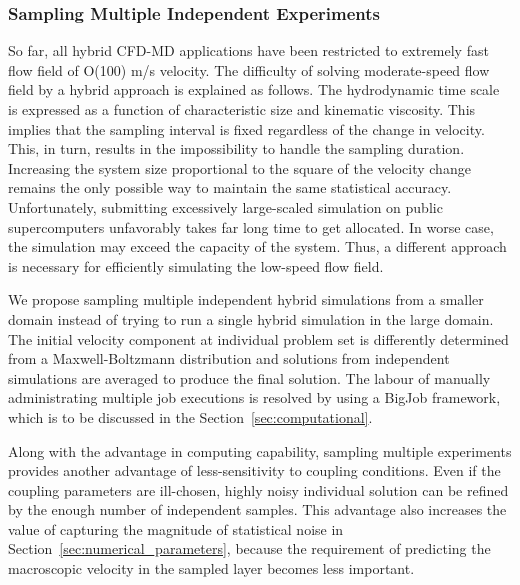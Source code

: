 \documentclass[preprint,12pt]{elsarticle}
\begin{document}
\subsubsection{Sampling Multiple Independent Experiments}
\label{sec:numerical_lowspeed}
So far, all hybrid CFD-MD applications have been restricted to extremely fast flow field of O(100) m/s velocity.
The difficulty of solving moderate-speed flow field by a hybrid approach is explained as follows. The hydrodynamic time scale is expressed as a function of characteristic size and kinematic viscosity. This implies that the sampling interval is fixed regardless of the change in velocity. This, in turn, results in the impossibility to handle the sampling duration. Increasing the system size proportional to the square of the velocity change remains the only possible way to maintain the same statistical accuracy. Unfortunately, submitting excessively large-scaled simulation on public supercomputers unfavorably takes far long time to get allocated. In worse case, the simulation may exceed the capacity of the system. Thus, a different approach is necessary for efficiently simulating the low-speed flow field.


We propose sampling multiple independent hybrid simulations from a smaller domain instead of trying to run a single hybrid simulation in the large domain.
The initial velocity component at individual problem set is differently determined from a Maxwell-Boltzmann distribution and solutions from independent simulations are averaged to produce the final solution. The labour of manually administrating multiple job executions is resolved by using a BigJob framework, which is to be discussed in the Section~\ref{sec:computational}.

Along with the advantage in computing capability, sampling multiple experiments provides another advantage of less-sensitivity to coupling conditions. Even if the coupling parameters are ill-chosen, highly noisy individual solution can be refined by the enough number of independent samples. This advantage also increases the value of capturing the magnitude of statistical noise in Section~\ref{sec:numerical_parameters}, because the requirement of predicting the macroscopic velocity in the sampled layer becomes less important.
\end{document}
